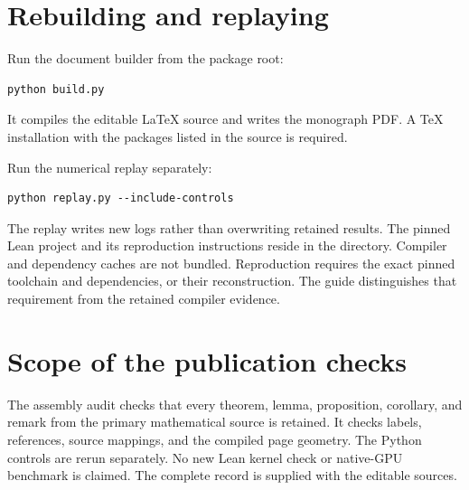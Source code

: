 \section{Rebuilding and replaying}
Run the document builder from the package root:
\begin{lstlisting}
python build.py
\end{lstlisting}
It compiles the editable LaTeX source and writes the monograph PDF. A TeX
installation with the packages listed in the source is required.

Run the numerical replay separately:
\begin{lstlisting}
python replay.py --include-controls
\end{lstlisting}
The replay writes new logs rather than overwriting retained results. The
pinned Lean project and its reproduction instructions reside in the
 directory. Compiler and dependency caches are not bundled.
Reproduction requires the exact pinned toolchain and dependencies, or their
reconstruction. The guide distinguishes that requirement from the retained
compiler evidence.

\section{Scope of the publication checks}
The assembly audit checks that every theorem, lemma, proposition, corollary,
and remark from the primary mathematical source is retained. It checks
labels, references, source mappings, and the compiled page geometry. The
Python controls are rerun separately. No new Lean kernel check or native-GPU
benchmark is claimed. The complete record is supplied with the editable
sources.

